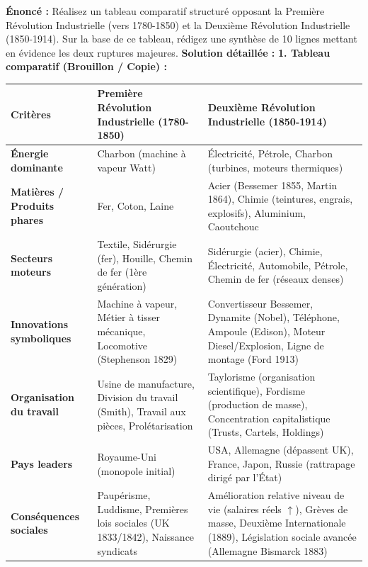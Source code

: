 \documentclass[11pt]{article}
\newcommand{\cle}[1]{{\popxbold\color{popdark}#1}}
\begin{document}
\begin{exoresolu}
\textbf{Énoncé :} Réalisez un tableau comparatif structuré opposant la Première Révolution Industrielle (vers 1780-1850) et la Deuxième Révolution Industrielle (1850-1914). Sur la base de ce tableau, rédigez une synthèse de 10 lignes mettant en évidence les deux ruptures majeures.
\tcblower
\textbf{Solution détaillée :}
\textbf{1. Tableau comparatif (Brouillon / Copie) :}
\begin{center}
\begin{tabularx}{\linewidth}{|l|X|X|}
\hline
\rowcolor{popblueL}
\textbf{Critères} & \textbf{Première Révolution Industrielle (1780-1850)} & \textbf{Deuxième Révolution Industrielle (1850-1914)} \\
\hline
\textbf{Énergie dominante} & Charbon (machine à vapeur Watt) & Électricité, Pétrole, Charbon (turbines, moteurs thermiques) \\
\hline
\textbf{Matières / Produits phares} & Fer, Coton, Laine & \cle{Acier} (Bessemer 1855, Martin 1864), Chimie (teintures, engrais, explosifs), Aluminium, Caoutchouc \\
\hline
\textbf{Secteurs moteurs} & Textile, Sidérurgie (fer), Houille, Chemin de fer (1ère génération) & Sidérurgie (acier), Chimie, Électricité, Automobile, Pétrole, Chemin de fer (réseaux denses) \\
\hline
\textbf{Innovations symboliques} & Machine à vapeur, Métier à tisser mécanique, Locomotive (Stephenson 1829) & Convertisseur Bessemer, Dynamite (Nobel), Téléphone, Ampoule (Edison), Moteur Diesel/Explosion, Ligne de montage (Ford 1913) \\
\hline
\textbf{Organisation du travail} & Usine de manufacture, Division du travail (Smith), Travail aux pièces, Prolétarisation & \cle{Taylorisme} (organisation scientifique), \cle{Fordisme} (production de masse), Concentration capitalistique (Trusts, Cartels, Holdings) \\
\hline
\textbf{Pays leaders} & \cle{Royaume-Uni} (monopole initial) & \cle{USA}, \cle{Allemagne} (dépassent UK), France, Japon, Russie (rattrapage dirigé par l'État) \\
\hline
\textbf{Conséquences sociales} & Paupérisme, Luddisme, Premières lois sociales (UK 1833/1842), Naissance syndicats & Amélioration relative niveau de vie (salaires réels $\uparrow$), Grèves de masse, Deuxième Internationale (1889), Législation sociale avancée (Allemagne Bismarck 1883) \\
\hline
\end{tabularx}
\end{center}


\end{exoresolu}
\end{document}
